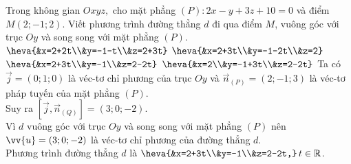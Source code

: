 \begin{ex}%
	Trong không gian $Oxyz,$ cho mặt phẳng $(P) \colon 2x-y+3z+10=0$ và điểm $M(2;-1;2)$. Viết phương trình đường thẳng $d$ đi qua điểm $M$, vuông góc với trục $Oy$ và song song với mặt phẳng $(P)$.
	\choice
	{$\heva{&x=2+2t\\&y=-1-t\\&z=2+3t}$}
	{$\heva{&x=2+3t\\&y=-1-2t\\&z=2}$}
	{\True $\heva{&x=2+3t\\&y=-1\\&z=2-2t}$}
	{$\heva{&x=2\\&y=-1+3t\\&z=2-2t}$}
	\loigiai
	{
	Ta có $\vec{j}=(0;1;0)$ là véc-tơ chỉ phương của trục $Oy$ và $\vec{n}_{(P)}=(2;-1;3)$ là véc-tơ pháp tuyến của mặt phẳng $(P)$.\\
	Suy ra $\left[\vec{j},\vec{n}_{(Q)}\right]=(3;0;-2)$.\\
	Vì $d$ vuông góc với trục $Oy$ và song song với mặt phẳng $(P)$ nên $\vv{u}=(3;0;-2)$ là véc-tơ chỉ phương của đường thẳng $d$.\\
	Phương trình đường thẳng $d$ là $\heva{&x=2+3t\\&y=-1\\&z=2-2t,} \,t \in \mathbb{R}$.
	}
\end{ex}	
